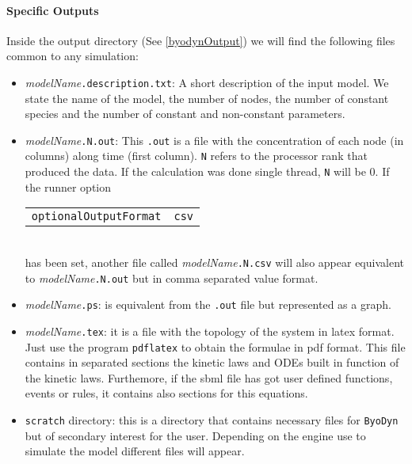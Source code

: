 \documentclass[a4paper, 11pt]{article}
\begin{document}
\paragraph{Specific Outputs} \label{specificOutputSimulation}
Inside the output directory (See \ref{byodynOutput}) we will find the following files common to any simulation:
\begin{itemize}
\item \textit{modelName}\texttt{.description.txt}:
  A short description of the input model. 
  We state the name of the model, the number of nodes, the number of constant species and the number of constant and non-constant parameters.
\item \textit{modelName}\texttt{.N.out}: 
  This \texttt{.out} is a file with the concentration of each node (in columns) along time (first column).
  \texttt{N} refers to the processor rank that produced the data. 
  If the calculation was done single thread, \texttt{N} will be 0.
  If the runner option \\[1.5ex]
  \begin{tabular}{cc}\texttt{optionalOutputFormat}&\texttt{csv}\end{tabular}\\[1.5ex]
  has been set, another file called \textit{modelName}\texttt{.N.csv} will also appear equivalent to \textit{modelName}\texttt{.N.out} but in comma separated value format.
\item \textit{modelName}\texttt{.ps}: 
  is equivalent from the \texttt{.out} file but represented as a graph.
\item \textit{modelName}\texttt{.tex}: 
  it is a file with the topology of the system in latex format. 
  Just use the program \texttt{pdflatex} to obtain the formulae in pdf format.
  This file contains in separated sections the kinetic laws and ODEs built in function of the kinetic laws.
  Furthemore, if the sbml file has got user defined functions, events or rules, it contains also sections for this equations.   

\item \texttt{scratch} directory: 
  this is a directory that contains necessary files for \texttt{ByoDyn} but of secondary interest for the user.
  Depending on the engine use to simulate the model different files will appear.
\end{itemize}
\end{document}
